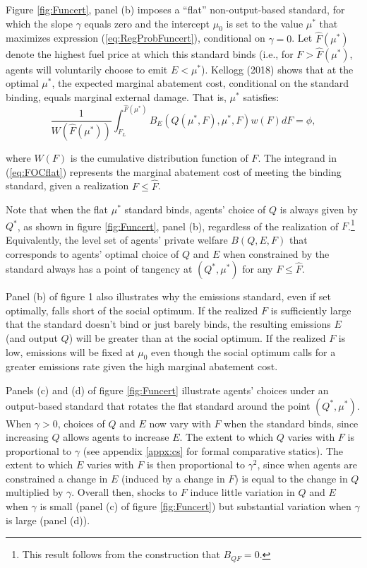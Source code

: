\documentclass[12pt]{article}
\begin{document}
Figure \ref{fig:Funcert}, panel (b) imposes a ``flat'' non-output-based standard, for which the slope $\gamma$ equals zero and the intercept $\mu_0$ is set to the value $\mu^*$ that maximizes expression (\ref{eq:RegProbFuncert}), conditional on $\gamma=0$. Let $\hat{F}(\mu^*)$ denote the highest fuel price at which this standard binds (i.e., for $F>\hat{F}(\mu^*)$, agents will voluntarily choose to emit $E<\mu^*$). Kellogg (2018) shows that at the optimal $\mu^*$, the expected marginal abatement cost, conditional on the standard binding, equals marginal external damage. That is, $\mu^*$ satisfies:
\begin{equation}
\frac{1}{W(\hat{F}(\mu^*))}\int_{F_L}^{\hat{F}(\mu^*)}B_E(Q(\mu^*,F),\mu^*,F)w(F)dF=\phi, \label{eq:FOCflat}
\end{equation}

\noindent where $W(F)$ is the cumulative distribution function of $F$. The integrand in (\ref{eq:FOCflat}) represents the marginal abatement cost of meeting the binding standard, given a realization $F\leq\hat{F}$.

Note that when the flat $\mu^*$ standard binds, agents' choice of $Q$ is always given by $Q^*$, as shown in figure \ref{fig:Funcert}, panel (b), regardless of the realization of $F$.\footnote{This result follows from the construction that $B_{QF}=0$.} Equivalently, the level set of agents' private welfare $B(Q,E,F)$ that corresponds to agents' optimal choice of $Q$ and $E$ when constrained by the standard always has a point of tangency at $(Q^*,\mu^*)$ for any $F\leq\hat{F}$.

Panel (b) of figure 1 also illustrates why the emissions standard, even if set optimally, falls short of the social optimum. If the realized $F$ is sufficiently large that the standard doesn't bind or just barely binds, the resulting emissions $E$ (and output $Q$) will be greater than at the social optimum. If the realized $F$ is low, emissions will be fixed at $\mu_0$ even though the social optimum calls for a greater emissions rate given the high marginal abatement cost.

Panels (c) and (d) of figure \ref{fig:Funcert} illustrate agents' choices under an output-based standard that rotates the flat standard around the point $(Q^*,\mu^*)$. When $\gamma>0$, choices of $Q$ and $E$ now vary with $F$ when the standard binds, since increasing $Q$ allows agents to increase $E$. The extent to which $Q$ varies with $F$ is proportional to $\gamma$ (see appendix \ref{appx:cs} for formal comparative statics). The extent to which $E$ varies with $F$ is then proportional to $\gamma^2$, since when agents are constrained a change in $E$ (induced by a change in $F$) is equal to the change in $Q$ multiplied by $\gamma$. Overall then, shocks to $F$ induce little variation in $Q$ and $E$ when $\gamma$ is small (panel (c) of figure \ref{fig:Funcert}) but substantial variation when $\gamma$ is large (panel (d)).
\end{document}

